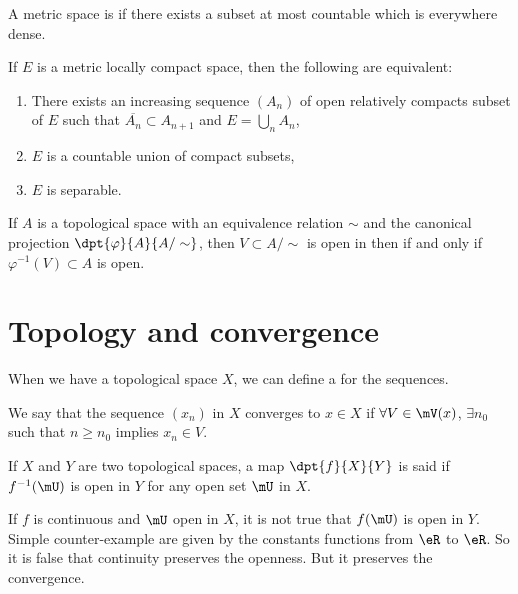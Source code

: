 \begin{definition}
A metric space is  if there exists a subset at most countable which is everywhere dense.
\end{definition}

\begin{proposition}
If $E$ is a metric locally compact space, then the following are equivalent:
\begin{enumerate}
\item There exists an increasing sequence $(A_n)$ of open relatively compacts subset of $E$ such that $\overline{A_n}\subset A_{n+1}$ and $E=\bigcup_n A_n$,

\item $E$ is a countable union of compact subsets,

\item $E$ is separable.
\end{enumerate}
\end{proposition}

If $A$ is a topological space with an equivalence relation $\sim$ and the canonical projection $\dpt{\varphi}{A}{A/\sim}$, then $V\subset A/\sim$ is open in then  if and only if $\varphi^{-1}(V)\subset A$ is open.

\section{Topology and convergence}

When we have a topological space $X$, we can define a  for the sequences.

\begin{definition}
We say that the sequence $(x_n)$ in $X$ converges to $x\in X$ if
$\forall V\in\mV(x)$, $\exists n_0$ such that $n\geq n_0$ implies $x_n\in V$. \label{def:convergence}
\end{definition}

\begin{definition}
If $X$ and $Y$ are two topological spaces, a map $\dpt{f}{X}{Y}$ is said  if $f^{-1}(\mU)$ is open in $Y$ for any open set $\mU$ in $X$.
\end{definition}

If $f$ is continuous and $\mU$ open in $X$, it is not true that $f(\mU)$ is open in $Y$. Simple counter-example are given by the constants functions from $\eR$ to $\eR$. So it is false that continuity preserves the openness. But it preserves the convergence.


